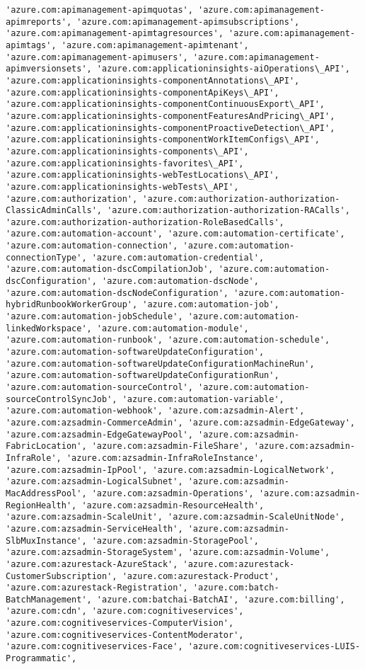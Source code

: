\documentclass[11pt]{article}
\begin{document}
\begin{Verbatim}[commandchars=\\\{\}]
'azure.com:apimanagement-apimquotas', 'azure.com:apimanagement-apimreports', 'azure.com:apimanagement-apimsubscriptions', 'azure.com:apimanagement-apimtagresources', 'azure.com:apimanagement-apimtags', 'azure.com:apimanagement-apimtenant', 'azure.com:apimanagement-apimusers', 'azure.com:apimanagement-apimversionsets', 'azure.com:applicationinsights-aiOperations\_API', 'azure.com:applicationinsights-componentAnnotations\_API', 'azure.com:applicationinsights-componentApiKeys\_API', 'azure.com:applicationinsights-componentContinuousExport\_API', 'azure.com:applicationinsights-componentFeaturesAndPricing\_API', 'azure.com:applicationinsights-componentProactiveDetection\_API', 'azure.com:applicationinsights-componentWorkItemConfigs\_API', 'azure.com:applicationinsights-components\_API', 'azure.com:applicationinsights-favorites\_API', 'azure.com:applicationinsights-webTestLocations\_API', 'azure.com:applicationinsights-webTests\_API', 'azure.com:authorization', 'azure.com:authorization-authorization-ClassicAdminCalls', 'azure.com:authorization-authorization-RACalls', 'azure.com:authorization-authorization-RoleBasedCalls', 'azure.com:automation-account', 'azure.com:automation-certificate', 'azure.com:automation-connection', 'azure.com:automation-connectionType', 'azure.com:automation-credential', 'azure.com:automation-dscCompilationJob', 'azure.com:automation-dscConfiguration', 'azure.com:automation-dscNode', 'azure.com:automation-dscNodeConfiguration', 'azure.com:automation-hybridRunbookWorkerGroup', 'azure.com:automation-job', 'azure.com:automation-jobSchedule', 'azure.com:automation-linkedWorkspace', 'azure.com:automation-module', 'azure.com:automation-runbook', 'azure.com:automation-schedule', 'azure.com:automation-softwareUpdateConfiguration', 'azure.com:automation-softwareUpdateConfigurationMachineRun', 'azure.com:automation-softwareUpdateConfigurationRun', 'azure.com:automation-sourceControl', 'azure.com:automation-sourceControlSyncJob', 'azure.com:automation-variable', 'azure.com:automation-webhook', 'azure.com:azsadmin-Alert', 'azure.com:azsadmin-CommerceAdmin', 'azure.com:azsadmin-EdgeGateway', 'azure.com:azsadmin-EdgeGatewayPool', 'azure.com:azsadmin-FabricLocation', 'azure.com:azsadmin-FileShare', 'azure.com:azsadmin-InfraRole', 'azure.com:azsadmin-InfraRoleInstance', 'azure.com:azsadmin-IpPool', 'azure.com:azsadmin-LogicalNetwork', 'azure.com:azsadmin-LogicalSubnet', 'azure.com:azsadmin-MacAddressPool', 'azure.com:azsadmin-Operations', 'azure.com:azsadmin-RegionHealth', 'azure.com:azsadmin-ResourceHealth', 'azure.com:azsadmin-ScaleUnit', 'azure.com:azsadmin-ScaleUnitNode', 'azure.com:azsadmin-ServiceHealth', 'azure.com:azsadmin-SlbMuxInstance', 'azure.com:azsadmin-StoragePool', 'azure.com:azsadmin-StorageSystem', 'azure.com:azsadmin-Volume', 'azure.com:azurestack-AzureStack', 'azure.com:azurestack-CustomerSubscription', 'azure.com:azurestack-Product', 'azure.com:azurestack-Registration', 'azure.com:batch-BatchManagement', 'azure.com:batchai-BatchAI', 'azure.com:billing', 'azure.com:cdn', 'azure.com:cognitiveservices', 'azure.com:cognitiveservices-ComputerVision', 'azure.com:cognitiveservices-ContentModerator', 'azure.com:cognitiveservices-Face', 'azure.com:cognitiveservices-LUIS-Programmatic', 
\end{Verbatim}
\end{document}
